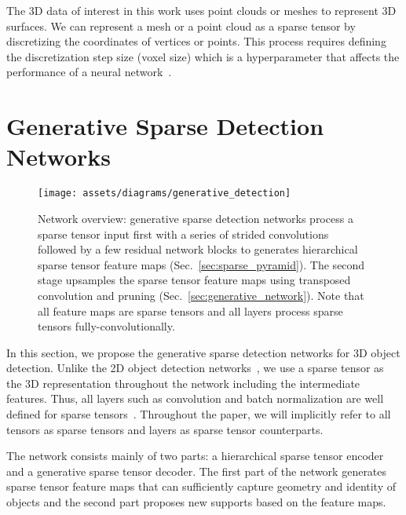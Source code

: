 \documentclass[runningheads]{llncs}
\begin{document}
The 3D data of interest in this work uses point clouds or meshes to represent 3D surfaces. We can represent a mesh or a point cloud as a sparse tensor by discretizing the coordinates of vertices or points. This process requires defining the discretization step size (voxel size) which is a hyperparameter that affects the performance of a neural network~\cite{FCGF2019,minkowskinet}. 










%
 \section{Generative Sparse Detection Networks}

\begin{figure}[t]
\centering
\small
\texttt{[image: assets/diagrams/generative\_detection]}
\caption{Network overview: generative sparse detection networks process a sparse tensor input first with a series of strided convolutions followed by a few residual network blocks to generates hierarchical sparse tensor feature maps (Sec.~\ref{sec:sparse_pyramid}). The second stage upsamples the sparse tensor feature maps using transposed convolution and pruning (Sec.~\ref{sec:generative_network}). Note that all feature maps are sparse tensors and all layers process sparse tensors fully-convolutionally.}
\label{fig:network}
\vspace{-1em}
\end{figure}

In this section, we propose the generative sparse detection networks for 3D object detection. Unlike the 2D object detection networks~\cite{lin2017feature,ren2015faster}, we use a sparse tensor as the 3D representation throughout the network including the intermediate features. Thus, all layers such as convolution and batch normalization are well defined for sparse tensors~\cite{sparseconvnet,minkowskinet}. Throughout the paper, we will implicitly refer to all tensors as sparse tensors and layers as sparse tensor counterparts.

The network consists mainly of two parts: a hierarchical sparse tensor encoder and a generative sparse tensor decoder. The first part of the network generates sparse tensor feature maps that can sufficiently capture geometry and identity of objects and the second part proposes new supports based on the feature maps.
\end{document}
